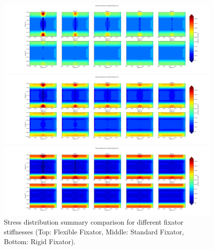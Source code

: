 \documentclass{article}
\begin{document}
\begin{figure}[htbp]
  \centering
  \begin{minipage}{\textwidth}
    \centering
    \includegraphics[width=\textwidth]{../output_advanced/Flexible/stress_summary.png}
  \end{minipage}

  \vspace{0.5cm}

  \begin{minipage}{\textwidth}
    \centering
    \includegraphics[width=\textwidth]{../output_advanced/Standard/stress_summary.png}
  \end{minipage}

  \vspace{0.5cm}

  \begin{minipage}{\textwidth}
    \centering
    \includegraphics[width=\textwidth]{../output_advanced/Rigid/stress_summary.png}
  \end{minipage}

  \caption{Stress distribution summary comparison for different fixator stiffnesses (Top: Flexible Fixator, Middle: Standard Fixator, Bottom: Rigid Fixator).}
  \label{fig:stress_summary_comparison}
\end{figure}
\end{document}
